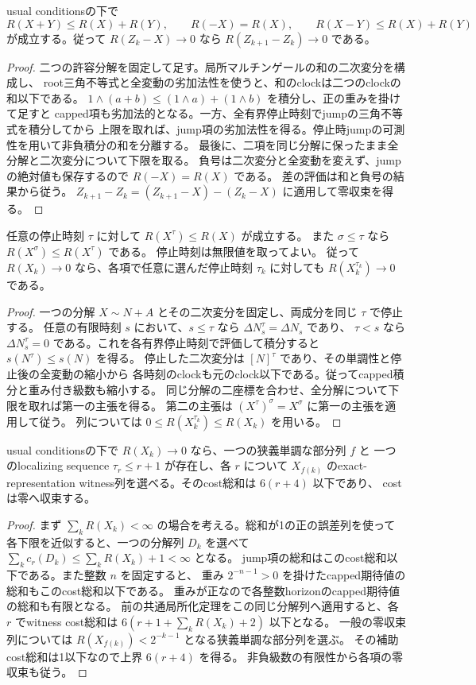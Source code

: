 \begin{lemma}[補助costの三角不等式と差]
usual conditionsの下で
\[
 R(X+Y)\le R(X)+R(Y),\qquad R(-X)=R(X),\qquad
 R(X-Y)\le R(X)+R(Y)
\]
が成立する。従って $R(Z_k-X)\to0$ なら $R(Z_{k+1}-Z_k)\to0$ である。
\end{lemma}
\begin{proof}
二つの許容分解を固定して足す。局所マルチンゲールの和の二次変分を構成し、
root三角不等式と全変動の劣加法性を使うと、和のclockは二つのclockの和以下である。
$1\wedge(a+b)\le(1\wedge a)+(1\wedge b)$ を積分し、正の重みを掛けて足すと
capped項も劣加法的となる。一方、全有界停止時刻でjumpの三角不等式を積分してから
上限を取れば、jump項の劣加法性を得る。停止時jumpの可測性を用いて非負積分の和を分離する。
最後に、二項を同じ分解に保ったまま全分解と二次変分について下限を取る。
負号は二次変分と全変動を変えず、jumpの絶対値も保存するので $R(-X)=R(X)$ である。
差の評価は和と負号の結果から従う。
$Z_{k+1}-Z_k=(Z_{k+1}-X)-(Z_k-X)$ に適用して零収束を得る。
\end{proof}
\begin{lemma}
任意の停止時刻 $\tau$ に対して $R(X^\tau)\le R(X)$ が成立する。
また $\sigma\le\tau$ なら $R(X^\sigma)\le R(X^\tau)$ である。
停止時刻は無限値を取ってよい。
従って $R(X_k)\to0$ なら、各項で任意に選んだ停止時刻 $\tau_k$ に対しても
$R(X_k^{\tau_k})\to0$ である。
\end{lemma}
\begin{proof}
一つの分解 $X\sim N+A$ とその二次変分を固定し、両成分を同じ $\tau$ で停止する。
任意の有限時刻 $s$ において、$s\le\tau$ なら $\Delta N^\tau_s=\Delta N_s$ であり、
$\tau<s$ なら $\Delta N^\tau_s=0$ である。これを各有界停止時刻で評価して積分すると
$s(N^\tau)\le s(N)$ を得る。
停止した二次変分は $[N]^\tau$ であり、その単調性と停止後の全変動の縮小から
各時刻のclockも元のclock以下である。従ってcapped積分と重み付き級数も縮小する。
同じ分解の二座標を合わせ、全分解について下限を取れば第一の主張を得る。
第二の主張は $(X^\tau)^\sigma=X^\sigma$ に第一の主張を適用して従う。
列については $0\le R(X_k^{\tau_k})\le R(X_k)$ を用いる。
\end{proof}
\begin{lemma}[補助costの零収束から共通局所化へ]
usual conditionsの下で $R(X_k)\to0$ なら、一つの狭義単調な部分列 $f$ と
一つのlocalizing sequence $\tau_r\le r+1$ が存在し、各 $r$ について
$X_{f(k)}$ のexact-representation witness列を選べる。そのcost総和は $6(r+4)$ 以下であり、
costは零へ収束する。
\end{lemma}
\begin{proof}
まず $\sum_k R(X_k)<\infty$ の場合を考える。総和が1の正の誤差列を使って
各下限を近似すると、一つの分解列 $D_k$ を選べて
$\sum_k c_r(D_k)\le\sum_k R(X_k)+1<\infty$ となる。
jump項の総和はこのcost総和以下である。また整数 $n$ を固定すると、
重み $2^{-n-1}>0$ を掛けたcapped期待値の総和もこのcost総和以下である。
重みが正なので各整数horizonのcapped期待値の総和も有限となる。
前の共通局所化定理をこの同じ分解列へ適用すると、各 $r$ でwitness cost総和は
$6(r+1+\sum_k R(X_k)+2)$ 以下となる。
一般の零収束列については $R(X_{f(k)})<2^{-k-1}$ となる狭義単調な部分列を選ぶ。
その補助cost総和は1以下なので上界 $6(r+4)$ を得る。
非負級数の有限性から各項の零収束も従う。
\end{proof}
